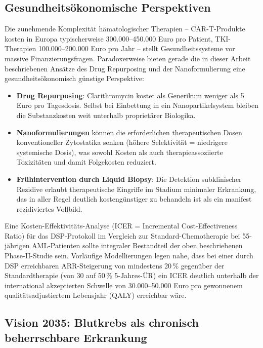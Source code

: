 ﻿\documentclass[12pt,a4paper]{article}
\theoremstyle{definition}
\begin{document}
\subsection{Gesundheitsökonomische Perspektiven}

Die zunehmende Komplexität hämatologischer Therapien -- CAR-T-Produkte kosten
in Europa typischerweise 300.000--450.000 Euro pro Patient, TKI-Therapien
100.000--200.000 Euro pro Jahr -- stellt Gesundheitssysteme vor massive
Finanzierungsfragen. Paradoxerweise bieten gerade die in dieser Arbeit
beschriebenen Ansätze des Drug Repurposing und der Nanoformulierung eine
gesundheitsökonomisch günstige Perspektive:

\begin{itemize}
  \item \textbf{Drug Repurposing}: Clarithromycin kostet als Generikum weniger als
        5 Euro pro Tagesdosis. Selbst bei Einbettung in ein Nanopartikelsystem
        bleiben die Substanzkosten weit unterhalb proprietärer Biologika.
  \item \textbf{Nanoformulierungen} können die erforderlichen therapeutischen
        Dosen konventioneller Zytostatika senken (höhere Selektivität = niedrigere
        systemische Dosis), was sowohl Kosten als auch therapieassoziierte Toxizitäten
        und damit Folgekosten reduziert.
  \item \textbf{Frühintervention durch Liquid Biopsy}: Die Detektion subklinischer
        Rezidive erlaubt therapeutische Eingriffe im Stadium minimaler Erkrankung,
        das in aller Regel deutlich kostengünstiger zu behandeln ist als ein manifest
        rezidiviertes Vollbild.
\end{itemize}

Eine Kosten-Effektivitäts-Analyse (ICER = Incremental Cost-Effectiveness Ratio) für
das DSP-Protokoll im Vergleich zur Standard-Chemotherapie bei 55-jährigen AML-Patienten
sollte integraler Bestandteil der oben beschriebenen Phase-II-Studie sein. Vorläufige
Modellierungen legen nahe, dass bei einer durch DSP erreichbaren ARR-Steigerung von
mindestens 20\,\% gegenüber der Standardtherapie (von 30 auf 50\,\% 5-Jahres-ÜR)
ein ICER deutlich unterhalb der international akzeptierten Schwelle von 30.000--50.000
Euro pro gewonnenem qualitätsadjustiertem Lebensjahr (QALY) erreichbar wäre.

\subsection{Vision 2035: Blutkrebs als chronisch beherrschbare Erkrankung}
\end{document}
